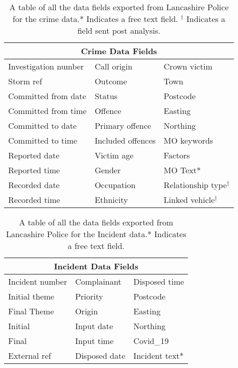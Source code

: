 \setlength{\extrarowheight}{12pt}
\begin{table}[]
\centering
\begin{tabular}{@{}lll@{}}
\toprule
\multicolumn{3}{c}{Crime Data Fields}                          \\ \midrule
Investigation number & Call origin       & Crown victim        \\
Storm ref            & Outcome           & Town                \\
Committed from date  & Status            & Postcode            \\
Committed from time  & Offence           & Easting             \\
Committed to date    & Primary offence   & Northing            \\
Committed to time    & Included offences & MO keywords         \\
Reported date        & Victim age        & Factors             \\
Reported time        & Gender            & MO Text*            \\
Recorded date        & Occupation        & Relationship type$^{\dagger}$ \\
Recorded time        & Ethnicity         & Linked vehicle$^{\dagger}$   \\ \bottomrule
\end{tabular}
\caption{\label{tab:data_fields_crime} A table of all the data fields exported from Lancashire Police for the crime data.* Indicates a free text field. $^{\dagger}$ Indicates a field sent post analysis.}
\end{table}

\begin{table}[]
\centering
\begin{tabular}{@{}lll@{}}
\toprule
\multicolumn{3}{c}{Incident Data Fields}        \\ \midrule
Incident number & Complainant   & Disposed time \\
Initial theme   & Priority      & Postcode      \\
Final Theme     & Origin        & Easting       \\
Initial         & Input date    & Northing      \\
Final           & Input time    & Covid\_19     \\
External ref    & Disposed date & Incident text*  \\ \bottomrule
\end{tabular}
\caption{\label{tab:data_fields_inc} A table of all the data fields exported from Lancashire Police for the Incident data.* Indicates a free text field.}
\end{table}